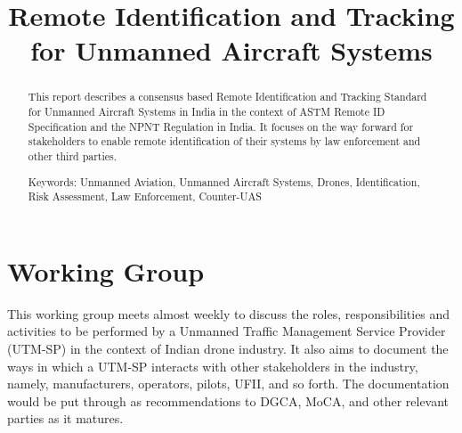 \documentclass{ua_wgs_base}
\begin{document}
\title{Remote Identification and Tracking for Unmanned Aircraft Systems}
\author{\printworkinggroup}

\maketitle
\cleardoublepage{}
\begin{abstract}
This report describes a consensus based Remote Identification and
Tracking Standard for Unmanned Aircraft Systems in India in the context
of ASTM 
Remote ID Specification and the NPNT Regulation
in India. It focuses on the way forward for stakeholders to enable
remote identification of their systems by law enforcement and other
third parties.

Keywords: Unmanned Aviation, Unmanned Aircraft Systems, Drones, Identification,
Risk Assessment, Law Enforcement, Counter-UAS

\tableofcontents{}
\end{abstract}

\chapter*{Working Group\label{sec:wg}}


This working group meets almost weekly to discuss the roles, responsibilities
and activities to be performed by a Unmanned Traffic Management Service
Provider (UTM-SP)
in the context of Indian drone industry. It also aims to document
the ways in which a UTM-SP interacts with other stakeholders in the
industry, namely, manufacturers, operators, pilots, UFII, and so forth.
The documentation would be put through as recommendations to DGCA,
MoCA,
and other relevant parties as it matures.
\end{document}
